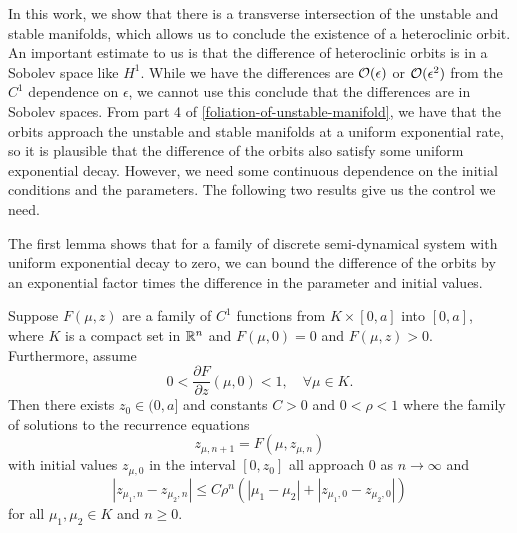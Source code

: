 In this work, we show that there is a transverse intersection of the unstable and stable manifolds, which allows us to conclude the existence of a heteroclinic orbit. An important estimate to us is that the difference of heteroclinic orbits is in a Sobolev space like \(H^1\). While we have the differences are \(\mathcal{O}(\epsilon)\) or \(\mathcal{O}(\epsilon^2)\) from the \(C^1\) dependence on \(\epsilon\), we cannot use this conclude that the differences are in Sobolev spaces. From part 4 of \cref{foliation-of-unstable-manifold}, we have that the orbits approach the unstable and stable manifolds at a uniform exponential rate, so it is plausible that the difference of the orbits also satisfy some uniform exponential decay. However, we need some continuous dependence on the initial conditions and the parameters. The following two results give us the control we need.

The first lemma shows that for a family of discrete semi-dynamical system with uniform exponential decay to zero, we can bound the difference of the orbits by an exponential factor times the difference in the parameter and initial values.

\begin{lem}\label{discrete-gronwall-estimate}
	Suppose \(F(\mu, z)\) are a family of \(C^1\) functions from \(K \times [0,a]\) into \([0,a]\), where \(K\) is a compact set in \(\mathbb{R}^n\) and \(F(\mu, 0) = 0\) and \(F(\mu, z) > 0\). Furthermore, assume
	\begin{equation}
		0< \frac{\partial F}{\partial z} (\mu , 0) < 1, \quad \forall \mu \in K.
	\end{equation}
	Then there exists \(z_0 \in (0,a]\) and constants \(C> 0\) and \(0<\rho< 1\) where the family of solutions to the recurrence equations
	\begin{equation}
		z_{\mu, n+1} = F(\mu, z_{\mu, n})
	\end{equation}
	with initial values \(z_{\mu, 0}\) in the interval \([0,z_0]\) all approach \(0\) as \(n\to \infty\) and
	\begin{equation}
		|z_{\mu_1,n} - z_{\mu_2,n} | \leq C \rho^n( |\mu_1- \mu_2| + |z_{\mu_1,0} - z_{\mu_2,0}|)
	\end{equation}
	for all \(\mu_1,\mu_2 \in K\) and \(n\geq 0\).
\end{lem}

